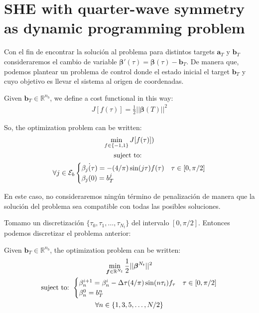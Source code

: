 \section{SHE with quarter-wave symmetry as dynamic programming problem}

Con el fin de encontrar la solución al problema para distintos targets $\bm{a}_T$ y $\bm{b}_T$ consideraremos el cambio de variable $\bm{\beta}'(\tau) = \bm{\beta}(\tau) - \bm{b}_T$. De manera que, podemos plantear un problema de control donde el estado inicial el target $\bm{b}_T$ y cuyo objetivo es llevar el sistema al origen de coordenadas.
\begin{problem}
    Given  $\bm{b}_T  \in \mathbb{R}^{n_b}$, we define a cost functional in this way: 
        \begin{gather}
        J[f(\tau)] =  \frac{1}{2}|| \bm{\beta}(T)||^2  
    \end{gather}


    So, the optimization problem can be written: 
    \begin{gather}
        \min_{f \in \{-1,1\} } J[f(\tau)]) \\
        \notag \text{suject to: } \\
        \notag \forall j \in \mathcal{E}_b
        \begin{cases}
            \dot{\beta_j(\tau)} =  - (4/\pi) \sin(j\tau) f(\tau) & \tau \in [0,\pi/2]\label{dyn}\\
            \beta_j(0) = b_T^j
        \end{cases} \\
    \end{gather}
    
\end{problem}

En este caso, no consideraremos ningún término de penalización de manera que la solución del problema sea compatible con todas las posibles soluciones.

Tomamo un discretización $\{\tau_0,\tau_1,\dots,\tau_{N_t} \}$ del intervalo $[0,\pi/2]$. Entonces podemos discretizar el problema anterior:

\begin{problem}
    Given  $\bm{b}_T  \in \mathbb{R}^{n_b}$,  the optimization problem can be written: 
    \begin{gather}
        \min_{\bm{f} \in \mathbb{R}^{N_t} } \frac{1}{2}||\bm{\beta}^{N_t}||^2 \\
        \text{suject to: }
        \begin{cases}
            \beta_n^{i+1} = \beta_n^{i} - \Delta \tau (4/\pi) \sin(n\tau_i) f_\tau & \tau \in [0,\pi/2]\label{dyn}\\
            \beta_n^0 = b_T^n
        \end{cases} \\
        \notag \forall n \in \{1,3,5,\dots,N/2 \}
    \end{gather}

\end{problem}

